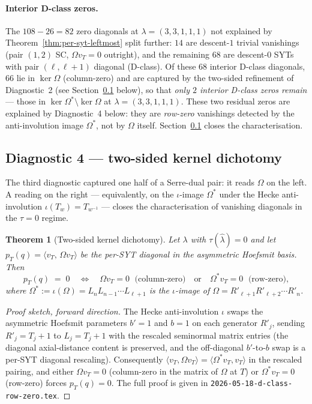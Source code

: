 \documentclass[11pt]{article}
\newtheorem{theorem}{Theorem}[section]
\theoremstyle{definition}
\newcommand{\Om}{\Omega}
\newcommand{\bla}{\widehat\lambda}
\newcommand{\Rp}{{R'}}
\begin{document}
\paragraph{Interior D-class zeros.}
The $108 - 26 = 82$ zero diagonals at $\lambda = (3, 3, 1, 1, 1)$ not
explained by Theorem~\ref{thm:per-syt-leftmost} split further: $14$ are
descent-$1$ trivial vanishings (pair $(1, 2)$ SC, $\Om v_T = 0$
outright), and the remaining $68$ are descent-$0$ SYTs with pair
$(\ell, \ell+1)$ diagonal (D-class).  Of these $68$ interior D-class
diagonals, $66$ lie in $\ker \Om$ (column-zero) and are captured by the
two-sided refinement of Diagnostic~2 (see Section~\ref{sec:diag4}
below), so that \emph{only $2$ interior D-class zeros remain} — those
in $\ker \Om^{*} \setminus \ker \Om$ at $\lambda = (3, 3, 1, 1, 1)$.
These two residual zeros are explained by Diagnostic~4 below: they are
\emph{row-zero} vanishings detected by the anti-involution image
$\Om^{*}$, not by $\Om$ itself.  Section~\ref{sec:diag4} closes the
characterisation.

\subsection{Diagnostic 4 --- two-sided kernel dichotomy}\label{sec:diag4}

The third diagnostic captured one half of a Serre-dual pair: it reads
$\Om$ on the left.  A reading on the right --- equivalently, on the
$\iota$-image $\Om^{*}$ under the Hecke anti-involution
$\iota(T_w) = T_{w^{-1}}$ --- closes the characterisation of vanishing
diagonals in the $\tau = 0$ regime.

\begin{theorem}[Two-sided kernel dichotomy]\label{thm:diag4}
Let $\lambda$ with $\tau(\bla) = 0$ and let
$p_T(q) = \langle v_T,\, \Om v_T \rangle$ be the per-SYT diagonal in the
asymmetric Hoefsmit basis.  Then
\[
   p_T(q) \;=\; 0
   \quad\Longleftrightarrow\quad
   \Om v_T = 0 \;\text{ (column-zero)}
   \quad\text{or}\quad
   \Om^{*} v_T = 0 \;\text{ (row-zero)},
\]
where $\Om^{*} := \iota(\Om) = L_n L_{n-1} \cdots L_{\ell+1}$ is the
$\iota$-image of $\Om = \Rp_{\ell+1} \Rp_{\ell+2} \cdots \Rp_n$.
\end{theorem}

\begin{proof}[Proof sketch, forward direction]
The Hecke anti-involution $\iota$ swaps the asymmetric Hoefsmit
parameters $b' = 1$ and $b = 1$ on each generator $\Rp_j$, sending
$\Rp_j = T_j + 1$ to $L_j = T_j + 1$ with the rescaled seminormal
matrix entries (the diagonal axial-distance content is preserved, and
the off-diagonal $b'$-to-$b$ swap is a per-SYT diagonal rescaling).
Consequently $\langle v_T, \Om v_T\rangle = \langle \Om^{*} v_T, v_T\rangle$
in the rescaled pairing, and either $\Om v_T = 0$ (column-zero in the
matrix of $\Om$ at $T$) or $\Om^{*} v_T = 0$ (row-zero) forces
$p_T(q) = 0$.  The full proof is given in
\texttt{2026-05-18-d-class-row-zero.tex}.
\end{proof}
\end{document}
